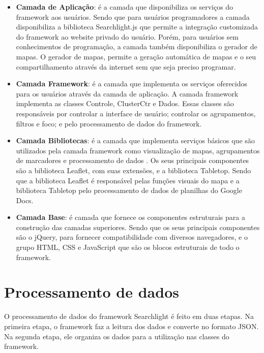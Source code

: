 \begin{itemize}
\item \textbf{Camada de Aplicação}: é a camada que disponibiliza os serviços do framework aos usuários. Sendo que para usuários programadores a camada disponibiliza a biblioteca Searchlight.js que permite a integração customizada do framework ao website privado do usuário. Porém, para usuários sem conhecimentos de programação, a camada também disponibiliza o gerador de mapas. O gerador de mapas, permite a geração automática de mapas e o seu compartilhamento através da internet sem que seja preciso programar.

\item \textbf{Camada Framework}: é a camada que implementa os serviços oferecidos para os usuários através da camada de aplicação. A camada framework implementa as classes Controle, ClusterCtr e Dados. Essas classes são responsáveis  por controlar a interface de usuário; controlar os agrupamentos, filtros e foco; e pelo processamento de dados do framework. 

\item \textbf{Camada Bibliotecas}: é a camada que implementa  serviços básicos que são utilizados pela camada framework como visualização de mapas, agrupamentos de marcadores e processamento de dados . Os seus principais componentes são a biblioteca Leaflet, com suas extensões, e a biblioteca Tabletop. Sendo que a biblioteca Leaflet é responsável pelas funções visuais do mapa e a biblioteca Tabletop pelo processamento de dados de planilhas do Google Docs.

\item \textbf{Camada Base}: é camada que fornece os componentes estruturais para a construção das camadas superiores. Sendo que os seus principais componentes são o jQuery, para fornecer compatibilidade com  diversos navegadores, e o grupo HTML, CSS e JavaScript que são os blocos estruturais de todo o framework.
 


\end{itemize}

\section{Processamento de dados}
	O processamento de dados do framework Searchlight é feito em duas etapas. Na primeira etapa, o framework faz a leitura dos dados e converte no formato JSON. Na segunda etapa, ele organiza os dados para a utilização nas classes do framework.	
	
